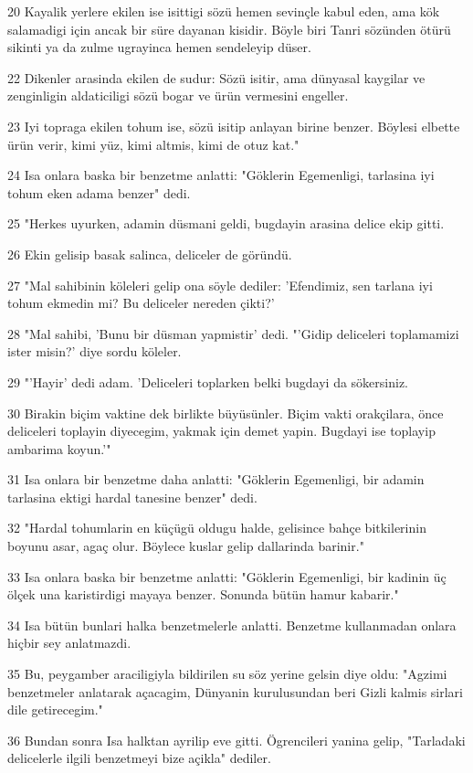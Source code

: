 \par 20 Kayalik yerlere ekilen ise isittigi sözü hemen sevinçle kabul eden, ama kök salamadigi için ancak bir süre dayanan kisidir. Böyle biri Tanri sözünden ötürü sikinti ya da zulme ugrayinca hemen sendeleyip düser.
\par 22 Dikenler arasinda ekilen de sudur: Sözü isitir, ama dünyasal kaygilar ve zenginligin aldaticiligi sözü bogar ve ürün vermesini engeller.
\par 23 Iyi topraga ekilen tohum ise, sözü isitip anlayan birine benzer. Böylesi elbette ürün verir, kimi yüz, kimi altmis, kimi de otuz kat."
\par 24 Isa onlara baska bir benzetme anlatti: "Göklerin Egemenligi, tarlasina iyi tohum eken adama benzer" dedi.
\par 25 "Herkes uyurken, adamin düsmani geldi, bugdayin arasina delice ekip gitti.
\par 26 Ekin gelisip basak salinca, deliceler de göründü.
\par 27 "Mal sahibinin köleleri gelip ona söyle dediler: 'Efendimiz, sen tarlana iyi tohum ekmedin mi? Bu deliceler nereden çikti?'
\par 28 "Mal sahibi, 'Bunu bir düsman yapmistir' dedi. "'Gidip deliceleri toplamamizi ister misin?' diye sordu köleler.
\par 29 "'Hayir' dedi adam. 'Deliceleri toplarken belki bugdayi da sökersiniz.
\par 30 Birakin biçim vaktine dek birlikte büyüsünler. Biçim vakti orakçilara, önce deliceleri toplayin diyecegim, yakmak için demet yapin. Bugdayi ise toplayip ambarima koyun.'"
\par 31 Isa onlara bir benzetme daha anlatti: "Göklerin Egemenligi, bir adamin tarlasina ektigi hardal tanesine benzer" dedi.
\par 32 "Hardal tohumlarin en küçügü oldugu halde, gelisince bahçe bitkilerinin boyunu asar, agaç olur. Böylece kuslar gelip dallarinda barinir."
\par 33 Isa onlara baska bir benzetme anlatti: "Göklerin Egemenligi, bir kadinin üç ölçek una karistirdigi mayaya benzer. Sonunda bütün hamur kabarir."
\par 34 Isa bütün bunlari halka benzetmelerle anlatti. Benzetme kullanmadan onlara hiçbir sey anlatmazdi.
\par 35 Bu, peygamber araciligiyla bildirilen su söz yerine gelsin diye oldu: "Agzimi benzetmeler anlatarak açacagim, Dünyanin kurulusundan beri Gizli kalmis sirlari dile getirecegim."
\par 36 Bundan sonra Isa halktan ayrilip eve gitti. Ögrencileri yanina gelip, "Tarladaki delicelerle ilgili benzetmeyi bize açikla" dediler.
